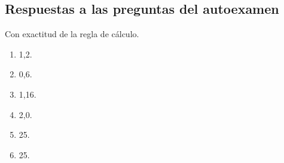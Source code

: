 \documentclass[12pt]{article}
\begin{document}
\subsection*{Respuestas a las preguntas del autoexamen}
Con exactitud de la regla de cálculo.
\begin{enumerate}[label=\arabic*.]
    \item 1,2.
    \item 0,6.
    \item 1,16.
    \item 2,0.
    \item 25.
    \item 25.
\end{enumerate}
\end{document}

